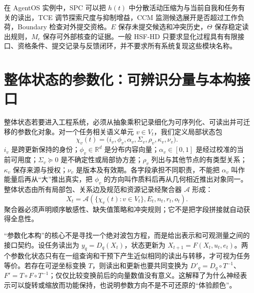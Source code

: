 在 AgentOS 实例中，SPC 可以把 $h(t)$ 中分散活动压缩为与当前自我和任务有关的读出，TCE 调节探索尺度与抑制增益，CCM 监测候选展开是否超过工作负荷，Boundary 检查对外提交资格。$E$ 保存未提交候选和冲突历史，$\Theta$ 保存稳定读出规则，$M_e$ 保存可外部核查的证据。一般 HSF-HD 只要求显化过程具有有限接口、资格条件、提交记录与反馈闭环，并不要求所有系统复现这些模块名称。

\section{整体状态的参数化：可辨识分量与本构接口}
\label{sec:rigorous_formulation_of_psi}

整体状态若要进入工程系统，必须从抽象乘积记录细化为可序列化、可读出并可迁移的参数化对象。对一个任务相关语义单元 $v\in V_t$，我们定义局部状态包
\begin{equation}
 \chi_v(t)=\bigl(i_v,\phi_v,\alpha_v,\Sigma_v,\rho_v,\kappa_v,\nu_v\bigr).
\end{equation}
$i_v$ 是跨更新保持的身份；$\phi_v\in\mathbb R^{d}$ 是分布内容向量；$\alpha_v\in[0,1]$ 是经过校准的当前可用度；$\Sigma_v\succeq0$ 是不确定性或局部协方差；$\rho_v$ 列出与其他节点的有类型关系；$\kappa_v$ 保存来源与授权；$\nu_v$ 是版本及有效期。各字段承担不同职责，不能把 $\alpha_v$ 叫作能量后再从“大”推出真实，把 $\phi_v$ 的方向叫作质料后再从几何相近推出对象同一。整体状态由所有局部包、关系边及规范和资源记录经聚合器 $\mathcal A$ 形成：
\begin{equation}
 X_t=\mathcal A\!\left(\{\chi_v(t):v\in V_t\},E_t,n_t,r_t,o_t\right).
\end{equation}
聚合器必须声明顺序敏感性、缺失值策略和冲突规则；它不是把字段拼接就自动获得全息性。

“参数化本构”的核心不是寻找一个绝对波包方程，而是给出表示和可观测量之间的接口契约。设任务读出为 $y_q=D_q(X_t)$，状态更新为 $X_{t+1}=F(X_t,u_t,e_t)$。两个参数化状态只有在一组查询和干预下产生近似相同的读出与转移，才可视为任务等价。若存在可逆坐标变换 $T$，则读出和更新也要共同变换为 $D'_q=D_q\circ T^{-1}$、$F'=T\circ F\circ T^{-1}$；仅仅比较变换前后的向量数值没有意义。这解释了为什么神经表示可以旋转或缩放而功能保持，也说明参数方向不是不可还原的“体验颜色”。

